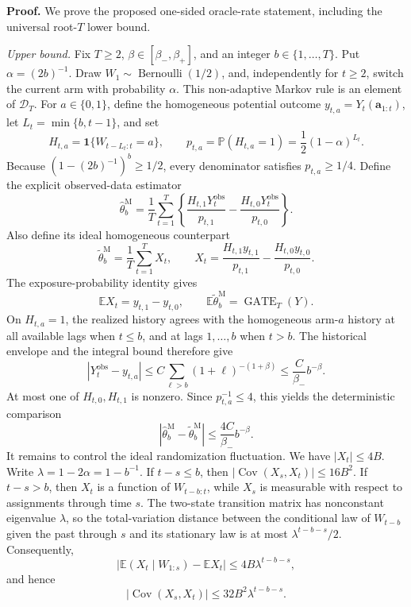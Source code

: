 \textbf{Proof.} We prove the proposed one-sided oracle-rate statement, including the universal root-\(T\) lower bound.

\emph{Upper bound.} Fix \(T\ge2\), \(\beta\in[\beta_-,\beta_+]\), and an integer \(b\in\{1,\ldots,T\}\). Put \(\alpha=(2b)^{-1}\). Draw \(W_1\sim\operatorname{Bernoulli}(1/2)\), and, independently for \(t\ge2\), switch the current arm with probability \(\alpha\). This non-adaptive Markov rule is an element of \(\mathcal D_T\). For \(a\in\{0,1\}\), define the homogeneous potential outcome \(y_{t,a}=Y_t(\mathbf a_{1:t})\), let \(L_t=\min\{b,t-1\}\), and set
\[
H_{t,a}=\mathbf1\{W_{t-L_t:t}=a\},
\qquad
p_{t,a}=\mathbb P(H_{t,a}=1)=\frac12(1-\alpha)^{L_t}.
\]
Because \((1-(2b)^{-1})^b\ge1/2\), every denominator satisfies \(p_{t,a}\ge1/4\). Define the explicit observed-data estimator
\[
\widehat\theta_b^{\mathrm M}
=\frac1T\sum_{t=1}^T
\left\{
\frac{H_{t,1}Y_t^{\mathrm{obs}}}{p_{t,1}}
-
\frac{H_{t,0}Y_t^{\mathrm{obs}}}{p_{t,0}}
\right\}.
\]
Also define its ideal homogeneous counterpart
\[
\widetilde\theta_b^{\mathrm M}
=\frac1T\sum_{t=1}^T X_t,
\qquad
X_t=\frac{H_{t,1}y_{t,1}}{p_{t,1}}-\frac{H_{t,0}y_{t,0}}{p_{t,0}}.
\]
The exposure-probability identity gives
\[
\mathbb E X_t=y_{t,1}-y_{t,0},
\qquad
\mathbb E\widetilde\theta_b^{\mathrm M}=\operatorname{GATE}_T(Y).
\]
On \(H_{t,a}=1\), the realized history agrees with the homogeneous arm-\(a\) history at all available lags when \(t\le b\), and at lags \(1,\ldots,b\) when \(t>b\). The historical envelope and the integral bound therefore give
\[
|Y_t^{\mathrm{obs}}-y_{t,a}|
\le C\sum_{\ell>b}(1+\ell)^{-(1+\beta)}
\le \frac{C}{\beta_-}b^{-\beta}.
\]
At most one of \(H_{t,0},H_{t,1}\) is nonzero. Since \(p_{t,a}^{-1}\le4\), this yields the deterministic comparison
\[
|\widehat\theta_b^{\mathrm M}-\widetilde\theta_b^{\mathrm M}|
\le \frac{4C}{\beta_-}b^{-\beta}.
\]
It remains to control the ideal randomization fluctuation. We have \(|X_t|\le4B\). Write \(\lambda=1-2\alpha=1-b^{-1}\). If \(t-s\le b\), then \(|\operatorname{Cov}(X_s,X_t)|\le16B^2\). If \(t-s>b\), then \(X_t\) is a function of \(W_{t-b:t}\), while \(X_s\) is measurable with respect to assignments through time \(s\). The two-state transition matrix has nonconstant eigenvalue \(\lambda\), so the total-variation distance between the conditional law of \(W_{t-b}\) given the past through \(s\) and its stationary law is at most \(\lambda^{t-b-s}/2\). Consequently,
\[
\left|\mathbb E(X_t\mid W_{1:s})-\mathbb EX_t\right|
\le4B\lambda^{t-b-s},
\]
and hence
\[
|\operatorname{Cov}(X_s,X_t)|
\le32B^2\lambda^{t-b-s}.
\]
